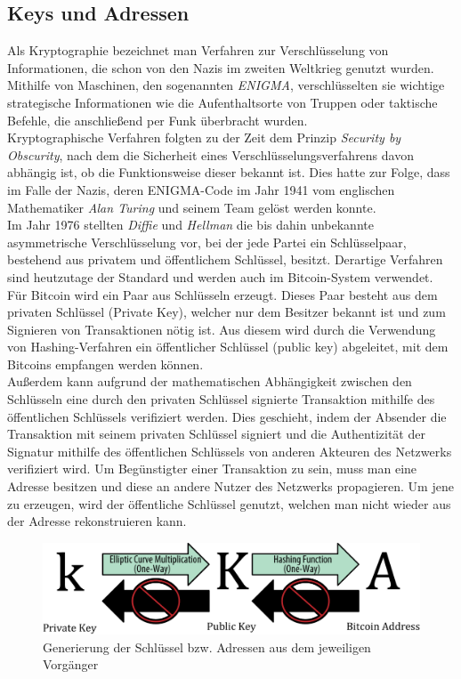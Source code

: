 \subsection{Keys und Adressen}
Als Kryptographie bezeichnet man Verfahren zur Verschlüsselung von Informationen, die schon von den Nazis im zweiten Weltkrieg genutzt wurden. 
Mithilfe von Maschinen, den sogenannten \emph{ENIGMA}, verschlüsselten sie wichtige strategische Informationen wie die Aufenthaltsorte von Truppen oder taktische Befehle, die anschließend per Funk überbracht wurden.\\
Kryptographische Verfahren folgten zu der Zeit dem Prinzip \emph{Security by Obscurity}, nach dem die Sicherheit eines Verschlüsselungsverfahrens davon abhängig ist, ob die Funktionsweise dieser bekannt ist. 
Dies hatte zur Folge, dass im Falle der Nazis, deren ENIGMA-Code im Jahr 1941 vom englischen Mathematiker \emph{Alan Turing} und seinem Team gelöst werden konnte.\\
Im Jahr 1976 stellten \emph{Diffie} und \emph{Hellman} die bis dahin unbekannte asymmetrische Verschlüsselung vor, bei der jede Partei ein Schlüsselpaar, bestehend aus privatem und öffentlichem Schlüssel, besitzt. 
Derartige Verfahren sind heutzutage der Standard und werden auch im Bitcoin-System verwendet.\\
Für Bitcoin wird ein Paar aus Schlüsseln erzeugt. 
Dieses Paar besteht aus dem privaten Schlüssel (Private Key), welcher nur dem Besitzer bekannt ist und zum Signieren von Transaktionen nötig ist.
Aus diesem wird durch die Verwendung von Hashing-Verfahren ein öffentlicher Schlüssel (public key) abgeleitet, mit dem Bitcoins empfangen werden können.\\
Außerdem kann aufgrund der mathematischen Abhängigkeit zwischen den Schlüsseln eine durch den privaten Schlüssel signierte Transaktion mithilfe des öffentlichen Schlüssels verifiziert werden. Dies geschieht, indem der Absender die Transaktion mit seinem privaten Schlüssel signiert und die Authentizität der Signatur mithilfe des öffentlichen Schlüssels von anderen Akteuren des Netzwerks verifiziert wird. Um Begünstigter einer Transaktion zu sein, muss man eine Adresse besitzen und diese an andere Nutzer des Netzwerks propagieren. Um jene zu erzeugen, wird der öffentliche Schlüssel genutzt, welchen man nicht wieder aus der Adresse rekonstruieren kann.\\
\begin{figure}[htpb]
	\centering
	\includegraphics[width=\textwidth]{images/public_and_private_key.png}
	\caption{Generierung der Schlüssel bzw. Adressen aus dem jeweiligen Vorgänger}
	\label{6braun:fig:keys}
\end{figure}
